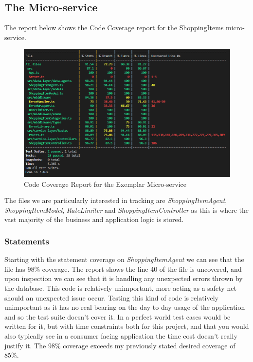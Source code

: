 \subsection{The Micro-service}
The report below shows the Code Coverage report for the ShoppingItems micro-service.
\begin{figure}[!htb]
\caption{Code Coverage Report for the Exemplar Micro-service}
\centering
\includegraphics[scale=0.62]{FYP_Dissertation_template/Figures/microservice-code-coverage.PNG}
\end{figure}
\FloatBarrier
The files we are particularly interested in tracking are \textit{ShoppingItemAgent}, \textit{ShoppingItemModel}, \textit{RateLimiter} and \textit{ShoppingItemController} as this is where the vast majority of the business and application logic is stored.
\subsubsection{Statements}
Starting with the statement coverage on \textit{ShoppingItemAgent} we can see that the file has 98\% coverage. The report shows the line 40 of the file is uncovered, and upon inspection we can see that it is handling any unexpected errors thrown by the database. This code is relatively unimportant, more acting as a safety net should an unexpected issue occur. Testing this kind of code is relatively unimportant as it has no real bearing on the day to day usage of the application and so the test suite doesn't cover it. In a perfect world test cases would be written for it, but with time constraints both for this project, and that you would also typically see in a consumer facing application the time cost doesn't really justify it. The 98\% coverage exceeds my previously stated desired coverage of 85\%.


